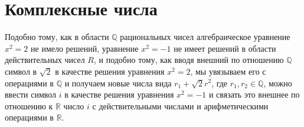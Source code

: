 \documentclass[a4paper, 12pt]{extarticle} %
\begin{document}
\section*{Компле$\acute{}$ксные числа}
Подобно тому, как в области $\mathbb{Q}$ рациональных чисел алгебраическое уравнение $x^2 = 2$ не имело решений, уравнение $x^2 = -1$ не имеет решений в области действительных чисел $R$, и подобно тому, как вводя внешний по отношению $\mathbb{Q}$ символ в $\sqrt{2}$ в качестве решения уравнения $x^2 = 2$, мы увязываем его с операциями в $\mathbb{Q}$ и получаем новые числа вида $r_1 + \sqrt{2}r^2$, где $r_1, r_2 \in \mathbb{Q}$, можно ввести символ $i$ в качестве решения уравнения $x^2 = -1$ и связать это внешнее по отношению к $\mathbb{R}$ число $i$ с действительными числами и арифметическими операциями в $\mathbb{R}$.
\end{document}
